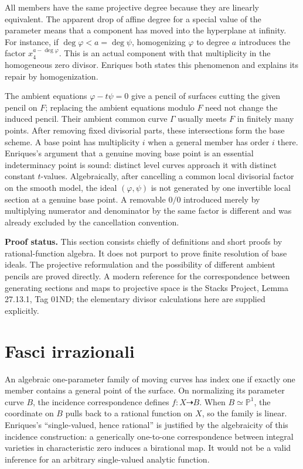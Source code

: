 All members have the same projective degree because they are linearly equivalent. The apparent drop of affine degree for a special value of the parameter means that a component has moved into the hyperplane at infinity. For instance, if \(\deg\varphi<a=\deg\psi\), homogenizing \(\varphi\) to degree \(a\) introduces the factor \(x_4^{a-\deg\varphi}\). This is an actual component with that multiplicity in the homogeneous zero divisor. Enriques both states this phenomenon and explains its repair by homogenization.

The ambient equations \(\varphi-t\psi=0\) give a pencil of surfaces cutting the given pencil on \(F\); replacing the ambient equations modulo \(F\) need not change the induced pencil. Their ambient common curve \(\Gamma\) usually meets \(F\) in finitely many points. After removing fixed divisorial parts, these intersections form the base scheme. A base point has multiplicity \(i\) when a general member has order \(i\) there. Enriques's argument that a genuine moving base point is an essential indeterminacy point is sound: distinct level curves approach it with distinct constant \(t\)-values. Algebraically, after cancelling a common local divisorial factor on the smooth model, the ideal \((\varphi,\psi)\) is not generated by one invertible local section at a genuine base point. A removable \(0/0\) introduced merely by multiplying numerator and denominator by the same factor is different and was already excluded by the cancellation convention.

\textbf{Proof status.} This section consists chiefly of definitions and short proofs by rational-function algebra. It does not purport to prove finite resolution of base ideals. The projective reformulation and the possibility of different ambient pencils are proved directly. A modern reference for the correspondence between generating sections and maps to projective space is the Stacks Project, Lemma 27.13.1, Tag 01ND; the elementary divisor calculations here are supplied explicitly.

\section{Fasci irrazionali}
\label{enriques-I-2}

An algebraic one-parameter family of moving curves has index one if exactly one member contains a general point of the surface. On normalizing its parameter curve \(B\), the incidence correspondence defines \(f:X\dashrightarrow B\). When \(B\simeq\mathbb P^1\), the coordinate on \(B\) pulls back to a rational function on \(X\), so the family is linear. Enriques's ``single-valued, hence rational'' is justified by the algebraicity of this incidence construction: a generically one-to-one correspondence between integral varieties in characteristic zero induces a birational map. It would not be a valid inference for an arbitrary single-valued analytic function.

